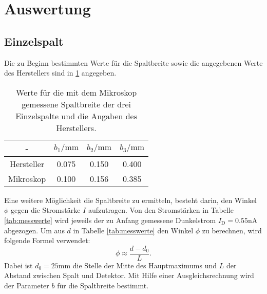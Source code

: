 \section{Auswertung}
\label{sec:Auswertung}

\subsection{Einzelspalt}
Die zu Beginn bestimmten Werte für die Spaltbreite sowie die angegebenen Werte des Herstellers sind in \ref{tab:b} angegeben.

\begin{table}
  \caption{Werte für die mit dem Mikroskop gemessene Spaltbreite der drei Einzelspalte und die Angaben des Herstellers.}
  \centering
  \label{tab:b}
  \begin{tabular}{c c c c}
    \toprule
   - & $b_1/\si{\milli\meter}$ & $b_2/\si{\milli\meter}$ & $b_3/\si{\milli\meter}$ \\
   \midrule
   Hersteller & 0.075 & 0.150 & 0.400 \\
   Mikroskop & 0.100 & 0.156 &  0.385\\
   \bottomrule
   \end{tabular}
\end{table}

Eine weitere Möglichkeit die Spaltbreite zu ermitteln, besteht darin, den Winkel $\phi$ gegen die Stromstärke $I$ aufzutragen. Von den Stromstärken in Tabelle \ref{tab:messwerte} wird jeweils der zu Anfang gemessene Dunkelstrom $I_\mathrm{D}=0.55\si{\nano\ampere}$ abgezogen. Um aus $d$ in Tabelle \ref{tab:messwerte} den Winkel $\phi$ zu berechnen, wird folgende Formel verwendet:
\begin{equation}
  \label{eqn:winkel}
  \phi \approx \frac{d-d_0}{L}.
\end{equation}
Dabei ist $d_0=25 \si{\milli\meter}$ die Stelle der Mitte des Hauptmaximums und $L$ der Abstand zwischen Spalt und Detektor.
Mit Hilfe einer Ausgleichsrechnung wird der Parameter $b$ für die Spaltbreite bestimmt.

